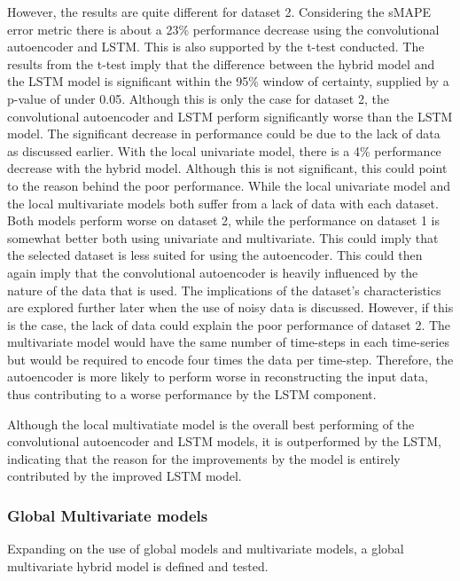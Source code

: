 However, the results are quite different for dataset 2.
Considering the sMAPE error metric there is about a 23\% performance decrease using the convolutional autoencoder and LSTM.
This is also supported by the t-test conducted. The results from the t-test imply that the difference between the hybrid model and the LSTM model
is significant within the 95\% window of certainty, supplied by a p-value of under 0.05.
Although this is only the case for dataset 2, the convolutional autoencoder and LSTM perform significantly worse than the LSTM model.
The significant decrease in performance could be due to the lack of data as discussed earlier.
With the local univariate model, there is a 4\% performance decrease with the hybrid model.
Although this is not significant, this could point to the reason behind the poor performance.
While the local univariate model and the local multivariate models both suffer from a lack of data with each dataset.
Both models perform worse on dataset 2, while the performance on dataset 1 is somewhat better both using univariate and multivariate.
This could imply that the selected dataset is less suited for using the autoencoder.
This could then again imply that the convolutional autoencoder is heavily influenced by the nature of the data that is used.
The implications of the dataset's characteristics are explored further later when the use of noisy data is discussed.
However, if this is the case, the lack of data could explain the poor performance of dataset 2.
The multivariate model would have the same number of time-steps in each time-series but would be required to encode four times the data per time-step.
Therefore, the autoencoder is more likely to perform worse in reconstructing the input data,
thus contributing to a worse performance by the LSTM component.


Although the local multivatiate model is the overall best performing of the convolutional autoencoder and LSTM models,
it is outperformed by the LSTM, indicating that the reason for the improvements by the model
is entirely contributed by the improved LSTM model.





\subsubsection{Global Multivariate models}

Expanding on the use of global models and multivariate models,
a global multivariate hybrid model is defined and tested.

